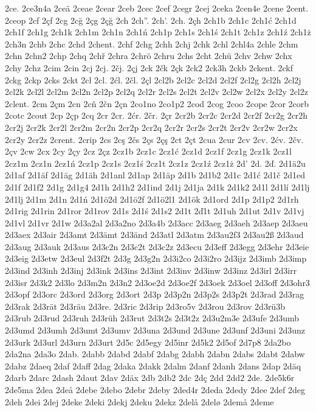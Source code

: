 2ce.
2ce3n4a
2ceä
2ceae
2cear
2ceb
2cec
2cef
2cegr
2cej
2ceka
2cen4e
2cene
2cent.
2ceop
2cf
2çf
2cg
2cğ
2çg
2çğ
2ch
2ch''.
2ch'.
2ch.
2çh
2ch1b
2ch1c
2ch1ć
2ch1d
2ch1f
2ch1g
2ch1k
2ch1m
2ch1n
2ch1ń
2ch1p
2ch1s
2ch1ś
2ch1t
2ch1z
2ch1ź
2ch1ż
2ch3n
2chb
2chc
2chd
2chent.
2chf
2chg
2chh
2chj
2chk
2chl
2chl4a
2chle
2chm
2chn
2chn2
2chp
2chq
2chř
2chra
2chrö
2chru
2chs
2cht
2chü
2chv
2chw
2chx
2chy
2chz
2cim
2cin
2cj
2cj.
2čj.
2çj
2ck
2čk
2çk
2ck2
2ck3h
2ckb
2ckent.
2ckf
2ckg
2ckp
2cks
2ckt
2cl
2cl.
2ćl.
2čl.
2çl
2cl2b
2cl2c
2cl2d
2cl2f
2cl2g
2cl2h
2cl2j
2cl2k
2cl2l
2cl2m
2cl2n
2cl2p
2cl2q
2cl2r
2cl2s
2cl2t
2cl2v
2cl2w
2cl2x
2cl2y
2cl2z
2clent.
2cm
2çm
2cn
2cň
2čn
2çn
2co1no
2co1p2
2cod
2cog
2coo
2cope
2cor
2corb
2cotc
2cout
2cp
2çp
2cq
2cr
2cr.
2ćr.
2čr.
2çr
2cr2b
2cr2c
2cr2d
2cr2f
2cr2g
2cr2h
2cr2j
2cr2k
2cr2l
2cr2m
2cr2n
2cr2p
2cr2q
2cr2r
2cr2s
2cr2t
2cr2v
2cr2w
2cr2x
2cr2y
2cr2z
2crent.
2crip
2cs
2cş
2čs
2çs
2çş
2ct
2çt
2cua
2cur
2cv
2cv.
2ćv.
2čv.
2çv
2cw
2cx
2cy
2çy
2cz
2çz
2cz1b
2cz1c
2cz1ć
2cz1d
2cz1f
2cz1g
2cz1k
2cz1l
2cz1m
2cz1n
2cz1ń
2cz1p
2cz1s
2cz1ś
2cz1t
2cz1z
2cz1ź
2cz1ż
2d'
2d.
2ď.
2d1ä2u
2d1af
2d1äf
2d1äg
2d1äh
2d1anl
2d1ap
2d1äp
2d1b
2d1b2
2d1c
2d1ć
2d1č
2d1ed
2d1f
2d1f2
2d1g
2d1g4
2d1h
2d1h2
2d1ind
2d1j
2d1ja
2d1k
2d1k2
2d1l
2d1lí
2d1lj
2đ1lj
2d1m
2d1n
2d1ń
2d1ö2d
2d1ö2f
2d1ö2l1
2d1ök
2d1ord
2d1p
2d1p2
2d1rh
2d1rig
2d1rin
2d1ror
2d1rov
2d1s
2d1ś
2d1s2
2d1t
2ď1t
2d1uh
2d1ut
2d1v
2d1vj
2d1vl
2d1vr
2d1w
2d3a2al
2d3a2no
2d3a4b
2d3acc
2d3aeg
2d3aeh
2d3aep
2d3aeu
2d3aex
2d3air
2d3amt
2d3ämt
2d3änd
2d3atl
2d3atm
2d3au2f3
2d3au2ß
2d3aud
2d3aug
2d3auk
2d3aus
2d3c2n
2d3c2t
2d3c2z
2d3ecu
2d3eff
2d3egg
2d3ehr
2d3eie
2d3eig
2d3etw
2d3eul
2d3f2t
2d3g
2d3g2n
2d3i2co
2d3i2ro
2d3ijz
2d3imb
2d3imp
2d3ind
2d3inh
2d3inj
2d3ink
2d3ins
2d3int
2d3inv
2d3inw
2d3inz
2d3irl
2d3irr
2d3isr
2d3k2
2d3lo
2d3m2n
2d3n2
2d3oe2d
2d3oe2f
2d3oek
2d3oel
2d3off
2d3ohr3
2d3opf
2d3orc
2d3ord
2d3org
2d3ort
2d3p
2d3p2n
2d3p2s
2d3p2t
2d3rad
2d3rag
2d3rak
2d3rät
2d3räu
2d3re.
2d3ric
2d3rip
2d3ro5v
2d3rou
2d3rov
2d3rü3b
2d3rub
2d3rud
2d3ruh
2d3rüh
2d3rut
2d3t2s
2d3t2z
2d3u2m3e
2d3ufe
2d3umb
2d3umd
2d3umh
2d3umt
2d3umv
2d3una
2d3und
2d3une
2d3unf
2d3uni
2d3unz
2d3urk
2d3url
2d3urn
2d3urt
2d5c
2d5egy
2d5inr
2d5k2
2d5of
2d7p8
2da2bo
2da2na
2da3o
2dab.
2dabb
2dabd
2dabf
2dabg
2dabh
2dabn
2dabs
2dabt
2dabw
2dabz
2daeq
2daf
2daff
2dag
2daka
2dakk
2dalm
2danf
2danh
2dans
2dap
2däq
2darb
2darc
2dash
2daut
2dav
2däx
2db
2db2
2dc
2dç
2dd
2dd2
2de.
2de5k6r
2de5ma
2dea
2deå
2debe
2debo
2debr
2deby
2ded4r
2deda
2dedy
2dee
2def
2deg
2deh
2dei
2dej
2deke
2deki
2dekj
2deku
2dekz
2delå
2delø
2demå
2deme
